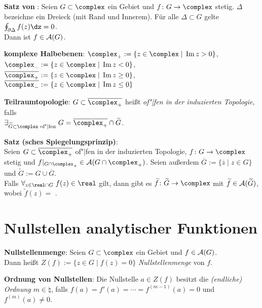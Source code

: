 \linie

\textbf{Satz von }:
Seien $G \subset \complex$ ein Gebiet und $f\colon G \rightarrow \complex$
stetig.
$\Delta$ bezeichne ein Dreieck (mit Rand und Innerem).
Für alle $\Delta \subset G$ gelte $\oint_{\partial\Delta} f(z)\dz = 0$.\\
Dann ist $f \in \mathcal{A}(G)$.

\textbf{komplexe Halbebenen}:
$\complex_+ := \{z \in \complex \;|\; \Im z > 0\}$,
$\complex_- := \{z \in \complex \;|\; \Im z < 0\}$,\\
$\overline{\complex_+} := \{z \in \complex \;|\; \Im z \ge 0\}$,
$\overline{\complex_-} := \{z \in \complex \;|\; \Im z \le 0\}$

\textbf{Teilraumtopologie}:
$G \subset \overline{\complex_+}$ heißt
\emph{of"|fen in der induzierten Topologie}, falls\\
$\exists_{\widetilde{G} \subset \complex \text{ of"|fen}}\;
G = \overline{\complex_+} \cap \widetilde{G}$.

\textbf{Satz (sches Spiegelungsprinzip)}:\\
Seien $G \subset \overline{\complex_+}$ of"|fen in der induzierten Topologie,
$f \colon G \rightarrow \complex$ stetig und
$f|_{G \cap \complex_+} \in \A(G \cap \complex_+)$.
Seien außerdem $\overline{G} := \{\overline{z} \;|\; z \in G\}$
und $\widetilde{G} := G \cup \overline{G}$.\\
Falls $\forall_{z \in \real \cap G}\; f(z) \in \real$ gilt, dann gibt es
$\widetilde{f}\colon \widetilde{G} \rightarrow \complex$ mit
$\widetilde{f} \in \mathcal{A}(\widetilde{G})$, wobei
$\widetilde{f}(z) =$ .

\section{%
    Nullstellen analytischer Funktionen%
}

\textbf{Nullstellenmenge}:
Seien $G \subset \complex$ ein Gebiet und $f \in \mathcal{A}(G)$.\\
Dann heißt $Z(f) := \{z \in G \;|\; f(z) = 0\}$
\emph{Nullstellenmenge} von $f$.

\textbf{Ordnung von Nullstellen}:
Die Nullstelle $a \in Z(f)$ besitzt die
\emph{(endliche) Ordnung $m \in \natural$}, falls
$f(a) = f'(a) = \dotsb = f^{(m-1)}(a) = 0$ und
$f^{(m)}(a) \not= 0$.

